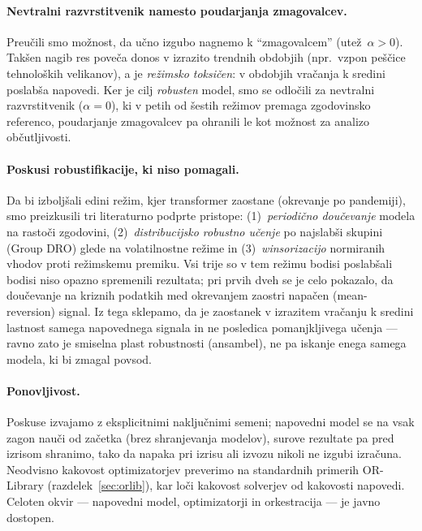 \paragraph{Nevtralni razvrstitvenik namesto poudarjanja zmagovalcev.} Preučili smo možnost, da učno izgubo nagnemo k ``zmagovalcem'' (utež~$\alpha>0$). Takšen nagib res poveča donos v izrazito trendnih obdobjih (npr.\ vzpon peščice tehnoloških velikanov), a je \emph{režimsko toksičen}: v obdobjih vračanja k sredini poslabša napovedi. Ker je cilj \emph{robusten} model, smo se odločili za nevtralni razvrstitvenik ($\alpha=0$), ki v petih od šestih režimov premaga zgodovinsko referenco, poudarjanje zmagovalcev pa ohranili le kot možnost za analizo občutljivosti.

\paragraph{Poskusi robustifikacije, ki niso pomagali.} Da bi izboljšali edini režim, kjer transformer zaostane (okrevanje po pandemiji), smo preizkusili tri literaturno podprte pristope: (1)~\emph{periodično doučevanje} modela na rastoči zgodovini, (2)~\emph{distribucijsko robustno učenje} po najslabši skupini (Group DRO) glede na volatilnostne režime in (3)~\emph{winsorizacijo} normiranih vhodov proti režimskemu premiku. Vsi trije so v tem režimu bodisi poslabšali bodisi niso opazno spremenili rezultata; pri prvih dveh se je celo pokazalo, da doučevanje na kriznih podatkih med okrevanjem zaostri napačen (mean-reversion) signal. Iz tega sklepamo, da je zaostanek v izrazitem vračanju k sredini lastnost samega napovednega signala in ne posledica pomanjkljivega učenja --- ravno zato je smiselna plast robustnosti (ansambel), ne pa iskanje enega samega modela, ki bi zmagal povsod.

\paragraph{Ponovljivost.}\label{sec:reproduc}
Poskuse izvajamo z eksplicitnimi naključnimi semeni; napovedni model se na vsak zagon nauči od začetka (brez shranjevanja modelov), surove rezultate pa pred izrisom shranimo, tako da napaka pri izrisu ali izvozu nikoli ne izgubi izračuna. Neodvisno kakovost optimizatorjev preverimo na standardnih primerih OR-Library (razdelek~\ref{sec:orlib}), kar loči kakovost solverjev od kakovosti napovedi. Celoten okvir --- napovedni model, optimizatorji in orkestracija --- je javno dostopen.

